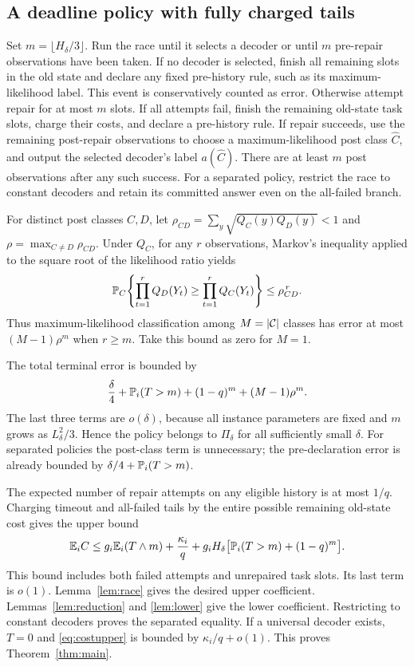 \subsection{A deadline policy with fully charged tails}
Set $m=\lfloor H_\delta/3\rfloor$. Run the race until it selects a decoder or
until $m$ pre-repair observations have been taken.
If no decoder is selected, finish all remaining slots in the old state
and declare any fixed pre-history rule, such as its maximum-likelihood label.
This event is conservatively counted as error. Otherwise attempt repair for
at most $m$ slots. If all attempts fail, finish the remaining old-state task
slots, charge their costs, and declare a pre-history rule. If repair succeeds,
use the remaining post-repair observations to choose a maximum-likelihood
post class $\widehat C$, and output the selected decoder's label
$a(\widehat C)$. There are at least $m$ post observations after any such success.
For a separated policy, restrict the race to constant decoders and retain
its committed answer even on the all-failed branch.

For distinct post classes $C,D$, let
$\rho_{CD}=\sum_y\sqrt{Q_C(y)Q_D(y)}<1$ and
$\rho=\max_{C\ne D}\rho_{CD}$. Under $Q_C$, for any $r$ observations,
Markov's inequality applied to the square root of the likelihood ratio yields
\[
 \mathbb P_C\!\left\{\prod_{t=1}^r Q_D(Y_t)\ge
                    \prod_{t=1}^r Q_C(Y_t)\right\}
 \le \rho_{CD}^{\,r}.
\]
Thus maximum-likelihood classification among $M=|\mathcal C|$ classes has error at
most $(M-1)\rho^m$ when $r\ge m$.
Take this bound as zero for $M=1$.

The total terminal error is bounded by
\begin{equation}\label{eq:totalerror}
 \frac{\delta}{4}+\mathbb P_i(T>m)+(1-q)^m+(M-1)\rho^m.
\end{equation}
The last three terms are $o(\delta)$, because all instance parameters are
fixed and $m$ grows as $L_\delta^2/3$. Hence the policy belongs to
$\Pi_\delta$ for all sufficiently small $\delta$. For separated policies
the post-class term is unnecessary; the pre-declaration error is already
bounded by $\delta/4+\mathbb P_i(T>m)$.

The expected number of repair attempts on any eligible history is at most
$1/q$. Charging timeout and all-failed tails by the entire possible remaining
old-state cost gives the upper bound
\begin{equation}\label{eq:costupper}
 \mathbb E_i C\le
 g_i\mathbb E_i(T\wedge m)+\frac{\kappa_i}{q}
 +g_iH_\delta\bigl[\mathbb P_i(T>m)+(1-q)^m\bigr].
\end{equation}
This bound includes both failed attempts and unrepaired task slots.
Its last term is $o(1)$. Lemma~\ref{lem:race} gives the desired upper
coefficient. Lemmas~\ref{lem:reduction} and \ref{lem:lower} give the lower
coefficient. Restricting to constant decoders proves the separated equality.
If a universal decoder exists, $T=0$ and \eqref{eq:costupper} is bounded by
$\kappa_i/q+o(1)$. This proves Theorem~\ref{thm:main}.

